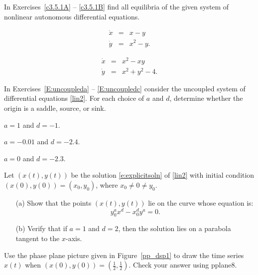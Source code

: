 \documentclass{ximera}
\begin{document}
\EXER

\TEXER

\noindent In Exercises~\ref{c3.5.1A} -- \ref{c3.5.1B} find all equilibria of
the given system of nonlinear autonomous differential equations.
\begin{exercise}  \label{c3.5.1A}
\begin{eqnarray*}
\dot{x} & = & x - y\\
\dot{y} & = & x^2 - y.
\end{eqnarray*}
\end{exercise}
\begin{exercise}  \label{c3.5.1B}
\begin{eqnarray*}
\dot{x} & = & x^2 - xy\\
\dot{y} & = & x^2 + y^2 - 4.
\end{eqnarray*}
\end{exercise}


\noindent In Exercises~\ref{E:uncoupleda} -- \ref{E:uncoupledc}
consider the uncoupled system of differential equations \eqref{lin2}.
For each choice of $a$ and $d$, determine whether the origin is a
saddle, source, or sink.
\begin{exercise} \label{E:uncoupleda}
$a=1$ and $d=-1$.
\end{exercise}
\begin{exercise} \label{E:uncoupledb}
$a=-0.01$ and $d=-2.4$.
\end{exercise}
\begin{exercise} \label{E:uncoupledc}
$a=0$ and $d=-2.3$.
\end{exercise}

\begin{exercise} \label{c3.4.2}
Let $(x(t),y(t))$ be the solution \eqref{e:explicitsoln} of \eqref{lin2}
with initial condition $(x(0),y(0))=(x_0,y_0)$, where $x_0\neq 0 \neq y_0$.
\begin{itemize}
\item[(a)] Show that the points $(x(t),y(t))$ lie on the curve whose 
equation is:
\[
y_0^ax^d - x_0^dy^a = 0.
\]
\item[(b)] Verify that if $a=1$ and $d=2$, then the solution lies
on a parabola tangent to the $x$-axis.
\end{itemize}
\end{exercise}

\begin{exercise} \label{c3.4.3}
Use the phase plane picture given in Figure~\ref{pp_dsp1} to
draw the time series $x(t)$ when $(x(0),y(0)) =
(\frac{1}{2},\frac{1}{2})$.  Check your answer using {\sf
pplane8}.
\end{exercise}
\end{document}
